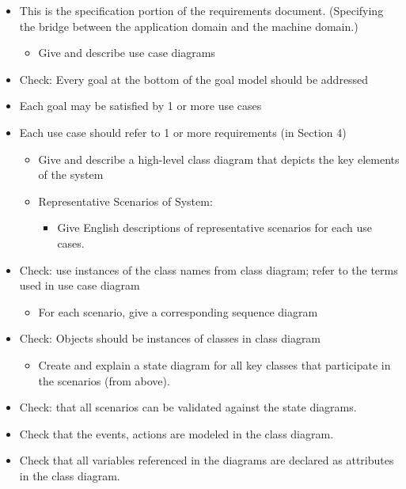 \documentclass[12pt]{article}
\begin{document}
\begin{itemize}
\item
  This is the specification portion of the requirements document.
  (Specifying the bridge between the application domain and the machine
  domain.)

  \begin{itemize}
  \item
    Give and describe use case diagrams
  \end{itemize}
\item
  Check: Every goal at the bottom of the goal model should be addressed
\item
  Each goal may be satisfied by 1 or more use cases
\item
  Each use case should refer to 1 or more requirements (in Section 4)

  \begin{itemize}
  \item
    Give and describe a high-level class diagram that depicts the key
    elements of the system
  \item
    Representative Scenarios of System:

    \begin{itemize}
    \item
      Give English descriptions of representative scenarios for each use
      cases.
    \end{itemize}
  \end{itemize}
\item
  Check: use instances of the class names from class diagram; refer to
  the terms used in use case diagram

  \begin{itemize}
  \item
    For each scenario, give a corresponding sequence diagram
  \end{itemize}
\item
  Check: Objects should be instances of classes in class diagram

  \begin{itemize}
  \item
    Create and explain a state diagram for all key classes that
    participate in the scenarios (from above).
  \end{itemize}
\item
  Check: that all scenarios can be validated against the state diagrams.
\item
  Check that the events, actions are modeled in the class diagram.
\item
  Check that all variables referenced in the diagrams are declared as
  attributes in the class diagram.
\end{itemize}
\end{document}
